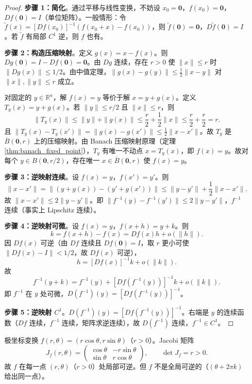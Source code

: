 \begin{proof}
\textbf{步骤 1：简化}。通过平移与线性变换，不妨设 $x_0 = \mathbf{0}$，$f(x_0) = \mathbf{0}$，$Df(\mathbf{0}) = I$（单位矩阵）。一般情形：令 $\tilde{f}(x) = [Df(x_0)]^{-1} (f(x_0 + x) - f(x_0))$，则 $\tilde{f}(\mathbf{0}) = \mathbf{0}$，$D\tilde{f}(\mathbf{0}) = I$。若 $\tilde{f}$ 有局部 $C^1$ 逆，则 $f$ 也有。

\textbf{步骤 2：构造压缩映射}。定义 $g(x) = x - f(x)$。则 $Dg(\mathbf{0}) = I - Df(\mathbf{0}) = \mathbf{0}$。由 $Dg$ 连续，存在 $r > 0$ 使 $\|x\| \le r$ 时 $\|Dg(x)\| \le 1/2$。由中值定理，$\|g(x) - g(y)\| \le \frac{1}{2} \|x - y\|$ 对 $\|x\|, \|y\| \le r$ 成立。

对固定的 $y \in \mathbb{R}^n$，解 $f(x) = y$ 等价于解 $x = y + g(x)$。定义 $T_y(x) = y + g(x)$。若 $\|y\| \le r/2$ 且 $\|x\| \le r$，则
\[
\|T_y(x)\| \le \|y\| + \|g(x)\| \le \frac{r}{2} + \frac{1}{2} \|x\| \le \frac{r}{2} + \frac{r}{2} = r.
\]
且 $\|T_y(x) - T_y(x')\| = \|g(x) - g(x')\| \le \frac{1}{2} \|x - x'\|$。故 $T_y$ 是 $\overline{B}(\mathbf{0}, r)$ 上的压缩映射。由 Banach 压缩映射原理（定理 \ref{thm:banach_fixed_point}），$T_y$ 有唯一不动点 $x = T_y(x)$，即 $f(x) = y$。故对每个 $y \in B(\mathbf{0}, r/2)$，存在唯一 $x \in \overline{B}(\mathbf{0}, r)$ 使 $f(x) = y$。

\textbf{步骤 3：逆映射连续}。设 $f(x) = y$，$f(x') = y'$。则
\[
\|x - x'\| = \|(y + g(x)) - (y' + g(x'))\| \le \|y - y'\| + \frac{1}{2} \|x - x'\|.
\]
故 $\|x - x'\| \le 2 \|y - y'\|$。即 $\|f^{-1}(y) - f^{-1}(y')\| \le 2 \|y - y'\|$，$f^{-1}$ 连续（事实上 Lipschitz 连续）。

\textbf{步骤 4：逆映射可微}。设 $f(x) = y$，$f(x + h) = y + k$。则
\[
k = f(x + h) - f(x) = Df(x) h + o(\|h\|).
\]
因 $Df(x)$ 可逆（由 $Df$ 连续且 $Df(\mathbf{0}) = I$，取 $r$ 更小可使 $\|Df(x) - I\| < 1/2$，故 $Df(x)$ 可逆），
\[
h = [Df(x)]^{-1} k + o(\|k\|).
\]
故
\[
f^{-1}(y + k) = f^{-1}(y) + [Df(f^{-1}(y))]^{-1} k + o(\|k\|).
\]
即 $f^{-1}$ 在 $y$ 处可微，$D(f^{-1})(y) = [Df(f^{-1}(y))]^{-1}$。

\textbf{步骤 5：逆映射 $C^1$}。$D(f^{-1})(y) = [Df(f^{-1}(y))]^{-1}$。右端是 $y$ 的连续函数（$Df$ 连续，$f^{-1}$ 连续，矩阵求逆连续），故 $D(f^{-1})$ 连续，$f^{-1} \in C^1$。
\end{proof}

\begin{example}[极坐标变换]\label{ex:polar_coordinates}
极坐标变换 $f(r, \theta) = (r \cos\theta, r \sin\theta)$（$r > 0$）。Jacobi 矩阵
\[
J_f(r, \theta) = \begin{pmatrix} \cos\theta & -r \sin\theta \\ \sin\theta & r \cos\theta \end{pmatrix}, \qquad \det J_f = r > 0.
\]
故 $f$ 在每一点 $(r, \theta)$（$r > 0$）处局部可逆。但 $f$ 不是全局可逆的（$(\theta + 2\pi k)$ 给出同一点）。
\end{example}

